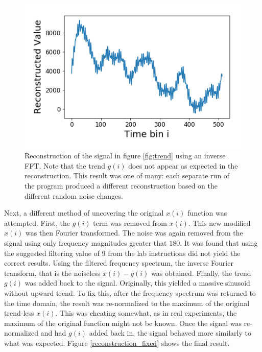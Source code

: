 \documentclass[twocolumn]{article}
\begin{document}
\begin{figure}
\centering
\includegraphics[width=\linewidth]{Reconstruction}
\caption{Reconstruction of the signal in figure \ref{fig:trend} using an inverse FFT. Note that the trend $g(i)$ does not appear as expected in the reconstruction. This result was one of many: each separate run of the program produced a different reconstruction based on the different random noise changes.}
\label{fig:Reconstruction}
\end{figure}

Next, a different method of uncovering the original $x(i)$ function was attempted. First, the $g(i)$ term was removed from $x(i)$. This new modified $x(i)$ was then Fourier transformed. The noise was again removed from the signal using only frequency magnitudes greater that $180$. It was found that using the suggested filtering value of 9 from the lab instructions did not yield the correct results. Using the filtered frequency spectrum, the inverse Fourier transform, that is the noiseless $x(i) - g(i)$ was obtained. Finally, the trend $g(i)$ was added back to the signal. Originally, this yielded a massive sinusoid without upward trend. To fix this, after the frequency spectrum was returned to the time domain, the result was re-normalized to the maximum of the original trend-less $x(i)$. This was cheating somewhat, as in real experiments, the maximum of the original function might not be known. Once the signal was re-normalized and had $g(i)$ added back in, the signal behaved more similarly to what was expected. Figure \ref{reconstruction_fixed} shows the final result.
\end{document}
